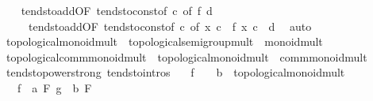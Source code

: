 \begin{isabellebody}
%
\isadelimproof
\ \ %
\endisadelimproof
%
\isatagproof
{}\isamarkupfalse%
\ tendsto{\isacharunderscore}{\kern0pt}add{\isacharbrackleft}{\kern0pt}OF\ tendsto{\isacharunderscore}{\kern0pt}const{\isacharbrackleft}{\kern0pt}of\ c{\isacharbrackright}{\kern0pt}{\isacharcomma}{\kern0pt}\ of\ f\ d{\isacharbrackright}{\kern0pt}\isanewline
\ \ \ \ \ tendsto{\isacharunderscore}{\kern0pt}add{\isacharbrackleft}{\kern0pt}OF\ tendsto{\isacharunderscore}{\kern0pt}const{\isacharbrackleft}{\kern0pt}of\ {\isachardoublequoteopen}{\isacharminus}{\kern0pt}c{\isachardoublequoteclose}{\isacharbrackright}{\kern0pt}{\isacharcomma}{\kern0pt}\ of\ {\isachardoublequoteopen}{\isasymlambda}x{\isachardot}{\kern0pt}\ c\ {\isacharplus}{\kern0pt}\ f\ x{\isachardoublequoteclose}\ {\isachardoublequoteopen}c\ {\isacharplus}{\kern0pt}\ d{\isachardoublequoteclose}{\isacharbrackright}{\kern0pt}\ \isamarkupfalse%
\ auto%
\endisatagproof
{\isafoldproof}%
%
\isadelimproof
\isanewline
%
\endisadelimproof
\isanewline
\isanewline
{}\isamarkupfalse%
\ topological{\isacharunderscore}{\kern0pt}monoid{\isacharunderscore}{\kern0pt}mult\ {\isacharequal}{\kern0pt}\ topological{\isacharunderscore}{\kern0pt}semigroup{\isacharunderscore}{\kern0pt}mult\ {\isacharplus}{\kern0pt}\ monoid{\isacharunderscore}{\kern0pt}mult\isanewline
{}\isamarkupfalse%
\ topological{\isacharunderscore}{\kern0pt}comm{\isacharunderscore}{\kern0pt}monoid{\isacharunderscore}{\kern0pt}mult\ {\isacharequal}{\kern0pt}\ topological{\isacharunderscore}{\kern0pt}monoid{\isacharunderscore}{\kern0pt}mult\ {\isacharplus}{\kern0pt}\ comm{\isacharunderscore}{\kern0pt}monoid{\isacharunderscore}{\kern0pt}mult\isanewline
\isanewline
{}\isamarkupfalse%
\ tendsto{\isacharunderscore}{\kern0pt}power{\isacharunderscore}{\kern0pt}strong\ {\isacharbrackleft}{\kern0pt}tendsto{\isacharunderscore}{\kern0pt}intros{\isacharbrackright}{\kern0pt}{\isacharcolon}{\kern0pt}\isanewline
\ \ \ f\ {\isacharcolon}{\kern0pt}{\isacharcolon}{\kern0pt}\ {\isachardoublequoteopen}{\isacharunderscore}{\kern0pt}\ {\isasymRightarrow}\ {\isacharprime}{\kern0pt}b\ {\isacharcolon}{\kern0pt}{\isacharcolon}{\kern0pt}\ topological{\isacharunderscore}{\kern0pt}monoid{\isacharunderscore}{\kern0pt}mult{\isachardoublequoteclose}\isanewline
\ \ \ {\isachardoublequoteopen}{\isacharparenleft}{\kern0pt}f\ {\isasymlonglongrightarrow}\ a{\isacharparenright}{\kern0pt}\ F{\isachardoublequoteclose}\ {\isachardoublequoteopen}{\isacharparenleft}{\kern0pt}g\ {\isasymlonglongrightarrow}\ b{\isacharparenright}{\kern0pt}\ F{\isachardoublequoteclose}\isanewline

\end{isabellebody}

